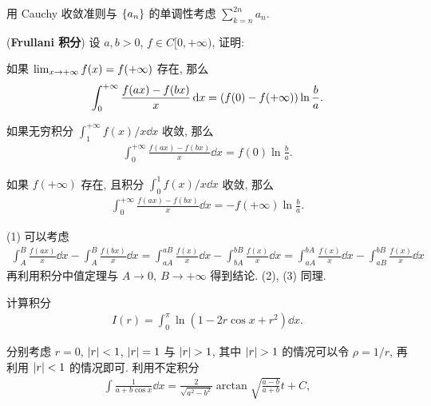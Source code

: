 \documentclass{ctexart}
\begin{document}
\begin{exercise}[series=exer]
    \begin{hint}
        用 Cauchy 收敛准则与 $ \qty{a_{n}} $ 的单调性考虑 $ \sum_{k = n}^{2n} a_{n} $. 
    \end{hint}
    \item (\textbf{Frullani 积分}) 设 $ a, b > 0 $, $ f \in C[0, +\infty) $, 证明:
    \begin{exercise}
        \item  如果 $ \lim_{x \to +\infty}f(x) = f(+\infty) $ 存在, 那么
        \begin{align*}
            \int_{0}^{+\infty} \frac{f(ax) - f(bx)}{x} \dd{x} = \qty(f(0) - f(+\infty))\ln\frac{b}{a}.
        \end{align*}
        \item 如果无穷积分 $ \int_{1}^{+\infty} f(x)/x \dd{x} $ 收敛, 那么
        \begin{align*}
            \int_{0}^{+\infty} \frac{f(ax) - f(bx)}{x} \dd{x} = f(0)\ln\frac{b}{a}.
        \end{align*}
        \item 如果 $ f(+\infty) $ 存在, 且积分 $ \int_{0}^{1} f(x)/x \dd{x} $ 收敛, 那么
        \begin{align*}
            \int_{0}^{+\infty} \frac{f(ax) - f(bx)}{x} \dd{x} = - f(+\infty)\ln\frac{b}{a}.
        \end{align*}
    \end{exercise}
    \begin{hint}
        (1) 可以考虑
        \begin{align*}
            \int_{A}^{B} \frac{f(ax)}{x} \dd{x} - \int_{A}^{B} \frac{f(bx)}{x} \dd{x} = \int_{aA}^{aB} \frac{f(x)}{x} \dd{x} - \int_{bA}^{bB} \frac{f(x)}{x} \dd{x} = \int_{aA}^{bA} \frac{f(x)}{x} \dd{x} - \int_{aB}^{bB} \frac{f(x)}{x} \dd{x}
        \end{align*}
        再利用积分中值定理与 $ A \to 0,\ B \to +\infty $ 得到结论. (2), (3) 同理.
    \end{hint}
    \item 计算积分
    \begin{align*}
        I(r) = \int_{0}^{\pi} \ln(1 - 2 r \cos x + r^{2}) \dd{x}.
    \end{align*}
    \begin{hint}
        分别考虑 $ r = 0 $, $ \abs{r} < 1 $, $ \abs{r} = 1 $ 与 $ \abs{r} > 1 $, 其中 $ \abs{r} > 1 $ 的情况可以令 $ \rho = 1/r $, 再利用 $ \abs{r} < 1 $ 的情况即可. 
        利用不定积分
        \begin{align*}
            \int \frac{1}{a + b\cos x} \dd{x} = \frac{2}{\sqrt{a^{2} - b^{2}}}\arctan\sqrt{\frac{a - b}{a + b}}t + C,

\end{align*}
\end{hint}
\end{exercise}
\end{document}
